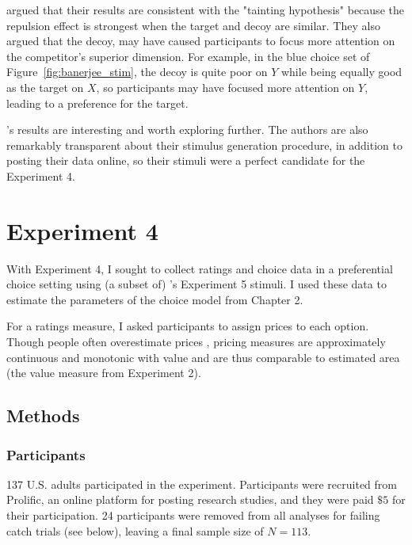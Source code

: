 \textcite{banerjeeFactorsThatPromote2024} argued that their results are consistent with the "tainting hypothesis" \parencite{simonson2014vices} because the repulsion effect is strongest when the target and decoy are similar. They also argued that the decoy, may have caused participants to focus more attention on the competitor's superior dimension. For example, in the blue choice set of Figure~\ref{fig:banerjee_stim}, the decoy is quite poor on $Y$ while being equally good as the target on $X$, so participants may have focused more attention on $Y$, leading to a preference for the target. 

\textcite{banerjeeFactorsThatPromote2024}'s results are interesting and worth exploring further. The authors are also remarkably transparent about their stimulus generation procedure, in addition to posting their data online, so their stimuli were a perfect candidate for the Experiment 4.

\section{Experiment 4}

With Experiment 4, I sought to collect ratings and choice data in a preferential choice setting using (a subset of) \textcite{banerjeeFactorsThatPromote2024}'s Experiment 5 stimuli. I used these data to estimate the parameters of the choice model from Chapter 2. 

For a ratings measure, I asked participants to assign prices to each option. Though people often overestimate prices \parencite{breidertREVIEWMETHODSMEASURING2006}, pricing measures are approximately continuous and monotonic with value and are thus comparable to estimated area (the value measure from Experiment 2).

\subsection{Methods}

\subsubsection{Participants}
137 U.S. adults participated in the experiment. Participants were recruited from Prolific, an online platform for posting research studies, and they were paid $\$5$ for their participation. 24 participants were removed from all analyses for failing catch trials (see below), leaving a final sample size of $N=113$. 

